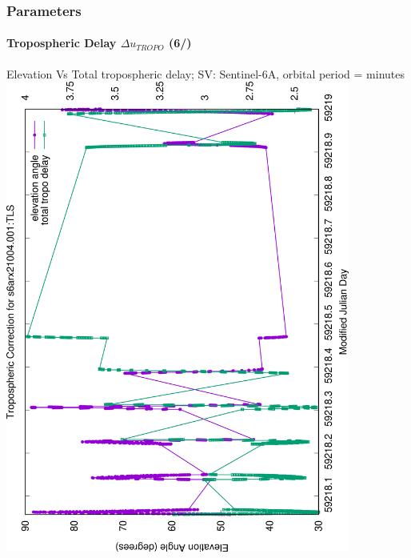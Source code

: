 \documentclass{beamer}
\begin{document}
\begin{frame}\frametitle{Parameters}\framesubtitle{Tropospheric Delay \(\Delta u_{TROPO}\) (6/)}
  Elevation Vs Total tropospheric delay; SV: Sentinel-6A, orbital period =  minutes
  \includegraphics[angle=-90, width=0.85\textwidth]{s6arx21004.001-tropo-correction-one-day.png}%
\end{frame}
\end{document}
